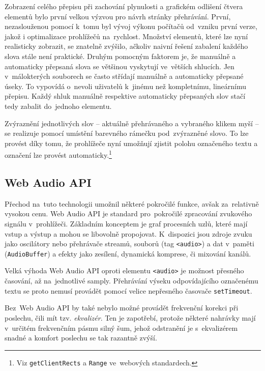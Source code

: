 Zobrazení celého přepisu při zachování plynulosti a grafickém odlišení
čtvera elementů bylo první velkou výzvou pro návrh stránky přehrávání.
První, nezaslouženou pomocí k~tomu byl vývoj výkonu počítačů od~vzniku první
verze, jakož i optimalizace prohlížečů na~rychlost. Množství elementů, které lze
nyní realisticky zobrazit, se znatelně zvýšilo, ačkoliv naivní řešení zabalení
každého slova stále není praktické. Druhým pomocným faktorem je, že manuálně a
automaticky přepsaná slova se většinou vyskytují ve~větších shlucích. Jen
v~málokterých souborech se často střídají manuálně a automaticky přepsané úseky.
To vypovídá o~nevoli uživatelů k~jinému než kompletnímu, lineárnímu přepisu.
Každý shluk manuálně respektive automaticky přepsaných slov stačí tedy zabalit
do~jednoho elementu.

Zvýraznění jednotlivých slov -- aktuálně přehrávaného a vybraného klikem myší --
se realizuje pomocí umístění barevného rámečku pod~zvýrazněné slovo. To lze
provést díky tomu, že prohlížeče nyní umožňují zjistit polohu označeného textu a
označení lze provést automaticky.\footnote{Viz \texttt{getClientRects} a
\texttt{Range} ve~webových standardech.}

\subsection{Web Audio API}

Přechod na~tuto technologii umožnil některé pokročilé funkce, avšak za~relativně
vysokou cenu. Web Audio API je standard pro~pokročilé zpracování zvukového
signálu v~prohlížeči. Základním konceptem je graf procesních uzlů, které mají
vstup a výstup a mohou se libovolně propojovat. K~dispozici jsou zdroje zvuku
jako oscilátory nebo přehrávače streamů, souborů (tag \texttt{<audio>}) a dat
v~paměti (\texttt{AudioBuffer}) a efekty jako zesílení, dynamická komprese, či
mixování kanálů.

Velká výhoda Web Audio API oproti elementu \texttt{<audio>} je možnost přesného
časování, až na~jednotlivé samply. Přehrávání výseku odpovídajícího označenému
textu se proto nemusí provádět pomocí velice nepřesného časovače
\texttt{setTimeout}.

Bez~Web Audio API by také nebylo možné provádět frekvenční korekci při poslechu,
čili mít tzv. \textit{ekvalizér}. Ten je zapotřebí, protože některé nahrávky
mají v~určitém frekvenčním pásmu silný šum, jehož odstranění je s~ekvalizérem
snadné a komfort poslechu se tak razantně zvýší.

